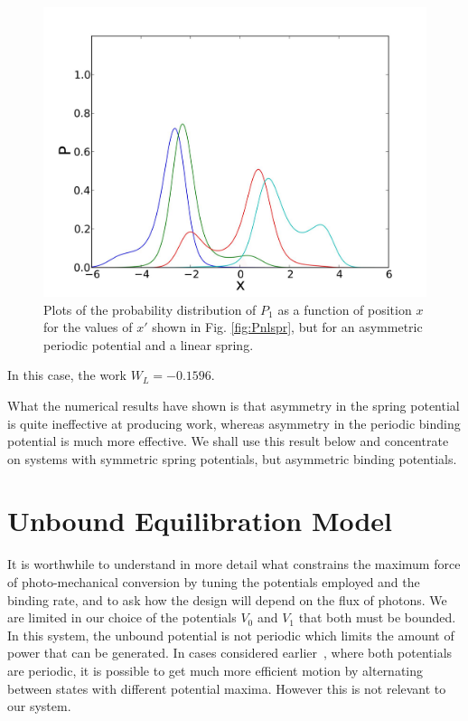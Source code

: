 \documentclass[11pt]{ucthesis}
\begin{document}
\begin{figure}[htp]
\begin{center}
\includegraphics[width=\textwidth]{Pasvp}
\caption{
Plots of the probability distribution of $P_1$ as a function of position $x$
for the values of $x'$ shown in Fig. \ref{fig:Pnlspr}, but for an asymmetric periodic potential and a linear
spring.
}
\label{fig:Pasvp}
\end{center}
\end{figure}

In this case, the work $W_L = -0.1596$.

What the numerical results have shown is that asymmetry in the spring potential
is quite ineffective at producing work, whereas asymmetry in the periodic
binding potential is much more effective. We shall use this result below and concentrate
on systems with symmetric spring potentials, but asymmetric binding potentials.

\section{Unbound Equilibration Model}
\label{sec:UEM}
It is worthwhile to
understand in more detail what constrains the maximum force of photo-mechanical conversion by
tuning the potentials employed and the binding rate, and to ask how the design will depend on 
the flux of photons. We are limited in our choice of the potentials $V_0$ and
$V_1$ that both must be bounded. In this system, the unbound potential is not periodic which
limits the amount of power that can be generated. In cases considered earlier~\cite{ProstPRL}, where both
potentials are periodic, it is possible to get much more efficient motion by
alternating between states with different potential maxima. However this is not
relevant to our system.
\end{document}
